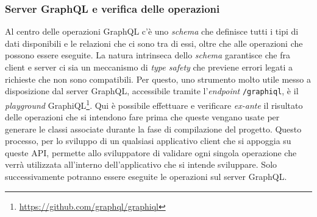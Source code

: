 \subsubsection{Server GraphQL e verifica delle operazioni}\label{subsection:graphql-server}

Al centro delle operazioni GraphQL c'è uno \textit{schema} che definisce tutti i tipi di dati disponibili e le relazioni che ci sono tra di essi, oltre che alle operazioni che possono essere eseguite. La natura intrinseca dello \textit{schema} garantisce che fra client e server ci sia un meccanismo di \textit{type safety} che previene errori legati a richieste che non sono compatibili. Per questo, uno strumento molto utile messo a disposizione dal  server GraphQL, accessibile tramite l'\textit{endpoint} \texttt{/graphiql}, è il \textit{playground} GraphiQL\footnote{\url{https://github.com/graphql/graphiql}}. Qui è possibile effettuare e verificare \textit{ex-ante} il risultato delle operazioni che si intendono fare prima che queste vengano usate per generare le classi associate durante la fase di compilazione del progetto. Questo processo, per lo sviluppo di un qualsiasi applicativo client che si appoggia su queste \ac{API}, permette allo sviluppatore di validare ogni singola operazione che verrà utilizzata all'interno dell'applicativo che si intende sviluppare.  Solo successivamente potranno essere eseguite le operazioni sul server GraphQL.

